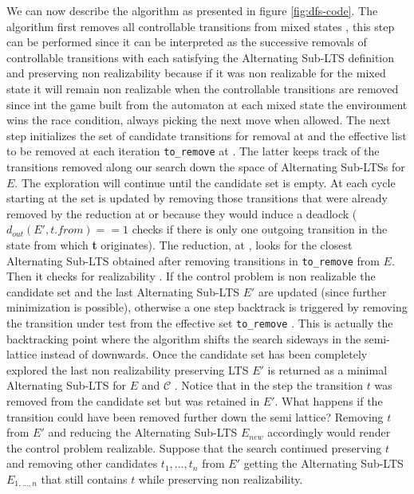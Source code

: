 We can now describe the algorithm as
presented in figure \ref{fig:dfs-code}. The algorithm first removes all controllable transitions from
mixed states , this step can be performed since it
can be interpreted as the successive removals of controllable 
transitions with each satisfying the Alternating Sub-LTS definition 
and preserving non realizability because if it was non realizable
for the mixed state it will remain non realizable when the controllable transitions are removed since int the game built from
the automaton at each mixed state the environment
wins the race condition, always picking the next move when allowed.
The next step initializes the set of 
candidate transitions
for removal at  and the effective list
to be removed at each iteration \texttt{to\_remove} at
.  The latter keeps track of the transitions
removed along our search down the space of
Alternating Sub-LTSs for $E$.  The exploration
will continue until the candidate set is empty.
At each cycle starting at  the set is updated  by 
removing those transitions that were already removed by the reduction
at  or because they would induce a deadlock 
($d_{out}(E', t.from) == 1$ checks if there is only one
outgoing transition in the state from which \textbf{t} originates).
The
reduction, at , looks for the closest
Alternating Sub-LTS obtained after removing 
transitions in \texttt{to\_remove} from $E$.
Then it checks for realizability .  If the control problem is non
realizable the candidate set and the last 
Alternating Sub-LTS $E'$ are updated (since further minimization is 
possible), otherwise a one step backtrack
is triggered by removing the transition under test from
the effective set \texttt{to\_remove} .
This is actually the backtracking point where the algorithm
shifts the search sideways in the semi-lattice instead of downwards.
Once the candidate set has been completely explored
the last non realizability preserving LTS $E'$ is
returned as a minimal Alternating Sub-LTS
for $E$ and $\mathcal{C}$ .
Notice that
in the step  the transition $t$ was removed
from the candidate set but was retained in $E'$.  What happens if
the transition could have been removed further down the semi lattice?  Removing $t$ from $E'$ and reducing the Alternating Sub-LTS 
$E_{new}$ accordingly would render the control problem realizable.  Suppose that
the search continued preserving $t$ and removing other candidates
$t_1, \ldots, t_n$ from $E'$ getting the Alternating Sub-LTS
$E_{1,\ldots,n}$ that still contains $t$ while preserving non realizability.
